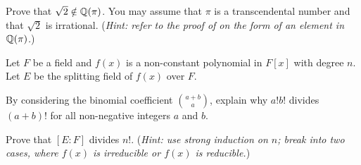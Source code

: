 \begin{problem}
    Prove that $\sqrt2 \notin \mathbb{Q}(\pi)$. You may assume that $\pi$ is a transcendental number and that $\sqrt2$ is irrational.\newline
    (\textit{Hint: refer to the proof of  on the form of an element in $\mathbb{Q}(\pi)$.})
\end{problem}

\begin{problem}
    Let $F$ be a field and $f(x)$ is a non-constant polynomial in $F[x]$ with degree $n$. Let $E$ be the splitting field of $f(x)$ over $F$.
    \begin{partquestions}{\roman*}
        \item By considering the binomial coefficient ${a+b\choose a}$, explain why $a!b!$ divides $(a+b)!$ for all non-negative integers $a$ and $b$.
        \item Prove that $[E:F]$ divides $n!$.\newline
        (\textit{Hint: use strong induction on $n$; break into two cases, where $f(x)$ is irreducible or $f(x)$ is reducible.})
    \end{partquestions}
\end{problem}
